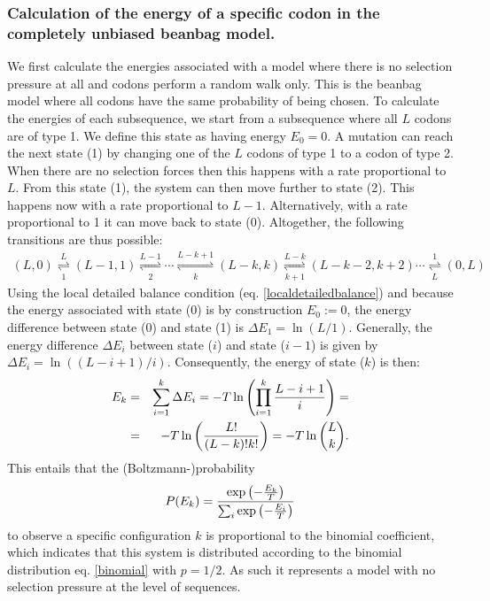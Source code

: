 \documentclass[a4paper,10pt]{paper}%
\begin{document}
\subsubsection{Calculation of the energy of a specific codon in the completely unbiased beanbag model.}
We first calculate the energies associated with  a model where  there is no selection pressure at all and codons perform a random walk only. This is the beanbag model where all codons have the same probability of being chosen. To calculate the energies of each subsequence, we   start from a subsequence  where all  $L$ codons are  of type  1. We define this state as having  energy $E_0=0$. A mutation can reach the next state (1)  by changing one of the $L$ codons of type 1 to a codon of type 2. When there are no selection forces then this  happens with a rate proportional to $L$.  From this state (1), the system can then move  further to state (2). This happens now with a rate proportional to $L-1$. Alternatively, with a rate  proportional to 1 it can move back to state (0). Altogether, the following transitions are thus possible:
%
% 
\begin{eqnarray}
\label{binomialunbiasedwalk}
(L,0) \overset{L}{\underset{1}{\rightleftharpoons}} (L-1,1) \overset{L-1}{\underset{2}{\rightleftharpoons}} \cdots \overset{L-k+1}{\underset{k}{\rightleftharpoons}} (L-k,k) \overset{L-k}{\underset{k+1}{\rightleftharpoons}}  (L-k-2,k+2)\cdots  \overset{1}{\underset{L}{\rightleftharpoons}}  (0,L) 
\end{eqnarray}
%
% 
Using the    local detailed balance condition (eq. \ref{localdetailedbalance})  and because the   energy associated with state (0) is  by construction $E_0:=0$,  the energy difference between state (0) and state (1) is $\Delta E_1=\ln(L/1)$. Generally, the energy difference $\Delta E_i$ between state ($i$) and state ($i-1$) is given by $\Delta E_i=\ln\left( (L-i+1)/i\right)$. Consequently, the energy of state ($k$) is then:
%
% 
\begin{eqnarray}
\label{binomialn}
E_k &=& \sum_{i=1}^k \Delta E_i= -T\ln\left( \prod_{i=1}^k {L-i+1 \over i}  \right)=\nonumber\\
&=& -T\ln\left(  L!\over (L-k)! k!   \right)= -T\ln\binom{L}{k}.
\end{eqnarray}
%
%   
This entails that the (Boltzmann-)probability
%
% 
\begin{displaymath}
P(E_k) = {\exp\left(- {E_k\over T}\right)\over \sum_i \exp\left(- {E_i\over T}\right)}
\end{displaymath}
%
% 
 to observe a specific configuration $k$ is proportional to the binomial coefficient, which indicates that this system is distributed according to the binomial distribution eq. \ref{binomial} with $p=1/2$. As such it  represents a model with no selection pressure at the level of sequences.  
\end{document}
